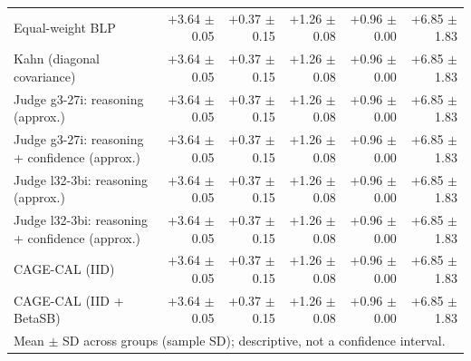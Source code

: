 \begin{tabular}{lrrrrr}
Equal-weight BLP & +3.64 {\scriptsize $\pm$ 0.05} & +0.37 {\scriptsize $\pm$ 0.15} & +1.26 {\scriptsize $\pm$ 0.08} & +0.96 {\scriptsize $\pm$ 0.00} & +6.85 {\scriptsize $\pm$ 1.83} \\
Kahn (diagonal covariance) & +3.64 {\scriptsize $\pm$ 0.05} & +0.37 {\scriptsize $\pm$ 0.15} & +1.26 {\scriptsize $\pm$ 0.08} & +0.96 {\scriptsize $\pm$ 0.00} & +6.85 {\scriptsize $\pm$ 1.83} \\
Judge g3-27i: reasoning (approx.) & +3.64 {\scriptsize $\pm$ 0.05} & +0.37 {\scriptsize $\pm$ 0.15} & +1.26 {\scriptsize $\pm$ 0.08} & +0.96 {\scriptsize $\pm$ 0.00} & +6.85 {\scriptsize $\pm$ 1.83} \\
Judge g3-27i: reasoning + confidence (approx.) & +3.64 {\scriptsize $\pm$ 0.05} & +0.37 {\scriptsize $\pm$ 0.15} & +1.26 {\scriptsize $\pm$ 0.08} & +0.96 {\scriptsize $\pm$ 0.00} & +6.85 {\scriptsize $\pm$ 1.83} \\
Judge l32-3bi: reasoning (approx.) & +3.64 {\scriptsize $\pm$ 0.05} & +0.37 {\scriptsize $\pm$ 0.15} & +1.26 {\scriptsize $\pm$ 0.08} & +0.96 {\scriptsize $\pm$ 0.00} & +6.85 {\scriptsize $\pm$ 1.83} \\
Judge l32-3bi: reasoning + confidence (approx.) & +3.64 {\scriptsize $\pm$ 0.05} & +0.37 {\scriptsize $\pm$ 0.15} & +1.26 {\scriptsize $\pm$ 0.08} & +0.96 {\scriptsize $\pm$ 0.00} & +6.85 {\scriptsize $\pm$ 1.83} \\
CAGE-CAL (IID) & +3.64 {\scriptsize $\pm$ 0.05} & +0.37 {\scriptsize $\pm$ 0.15} & +1.26 {\scriptsize $\pm$ 0.08} & +0.96 {\scriptsize $\pm$ 0.00} & +6.85 {\scriptsize $\pm$ 1.83} \\
CAGE-CAL (IID + BetaSB) & +3.64 {\scriptsize $\pm$ 0.05} & +0.37 {\scriptsize $\pm$ 0.15} & +1.26 {\scriptsize $\pm$ 0.08} & +0.96 {\scriptsize $\pm$ 0.00} & +6.85 {\scriptsize $\pm$ 1.83} \\
\bottomrule
\multicolumn{6}{l}{\scriptsize Mean $\pm$ SD across groups (sample SD); descriptive, not a confidence interval.} \\
\end{tabular}
